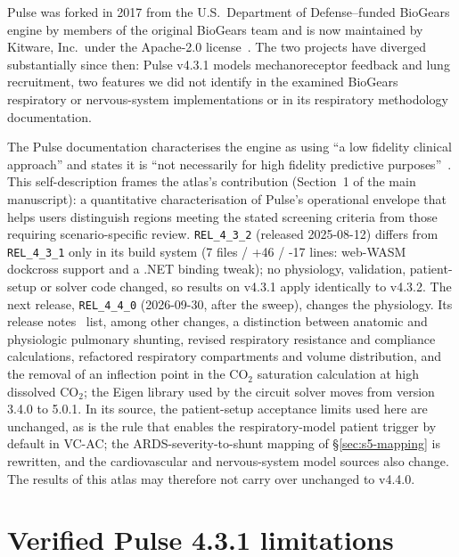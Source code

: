 \documentclass[pdflatex,sn-nature]{sn-jnl}%
\newcommand{\mainref}[2]{#2}
\begin{document}
Pulse was forked in 2017 from the U.S.\ Department of Defense--funded BioGears engine by members of the original BioGears team and is now maintained by Kitware, Inc.\ under the Apache-2.0 license~\cite{pulseabout,pulsefaq}. The two projects have diverged substantially since then: Pulse v4.3.1 models mechanoreceptor feedback and lung recruitment, two features we did not identify in the examined BioGears respiratory or nervous-system implementations or in its respiratory methodology documentation.

The Pulse documentation characterises the engine as using ``a low fidelity clinical approach'' and states it is ``not necessarily for high fidelity predictive purposes''~\cite{pulsesystem}. This self-description frames the atlas's contribution (Section~\mainref{sec:intro}{1} of the main manuscript): a quantitative characterisation of Pulse's operational envelope that helps users distinguish regions meeting the stated screening criteria from those requiring scenario-specific review. \texttt{REL\_4\_3\_2} (released 2025-08-12) differs from \texttt{REL\_4\_3\_1} only in its build system (7 files / +46 / -17 lines: web-WASM dockcross support and a .NET binding tweak); no physiology, validation, patient-setup or solver code changed, so results on v4.3.1 apply identically to v4.3.2. The next release, \texttt{REL\_4\_4\_0} (2026-09-30, after the sweep), changes the physiology. Its release notes~\cite{pulse440} list, among other changes, a distinction between anatomic and physiologic pulmonary shunting, revised respiratory resistance and compliance calculations, refactored respiratory compartments and volume distribution, and the removal of an inflection point in the CO$_2$ saturation calculation at high dissolved CO$_2$; the Eigen library used by the circuit solver moves from version 3.4.0 to 5.0.1. In its source, the patient-setup acceptance limits used here are unchanged, as is the rule that enables the respiratory-model patient trigger by default in VC-AC; the ARDS-severity-to-shunt mapping of \S\ref{sec:s5-mapping} is rewritten, and the cardiovascular and nervous-system model sources also change. The results of this atlas may therefore not carry over unchanged to v4.4.0.


\section{Verified Pulse 4.3.1 limitations}\label{sec:s2}
\end{document}
